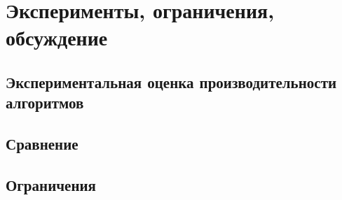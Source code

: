 \chapter{Эксперименты, ограничения, обсуждение}\label{ch:ch5}

\section{Экспериментальная оценка производительности алгоритмов}\label{sec:ch5/sect1}
\section{Сравнение}\label{sec:ch4/sect2}
\section{Ограничения}\label{sec:ch4/sect3}

\clearpage